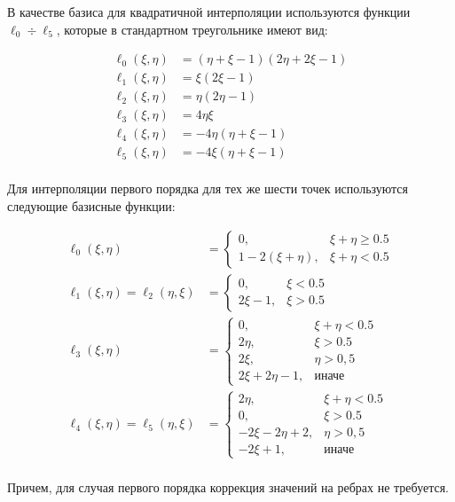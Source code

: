 В качестве базиса для квадратичной интерполяции используются функции $\ell_0 \div \ell_5$, которые в стандартном треугольнике  имеют вид:

\begin {equation}
\begin {aligned}
\ell_0 (\xi, \eta)&= (\eta + \xi -1)(2\eta + 2\xi - 1) \\
\ell_1 (\xi, \eta)&= \xi(2\xi - 1) \\
\ell_2 (\xi, \eta)&= \eta (2\eta - 1) \\
\ell_3 (\xi, \eta)&= 4\eta\xi \\
\ell_4 (\xi, \eta)&= -4\eta(\eta + \xi - 1) \\
\ell_5 (\xi, \eta)&= -4\xi(\eta + \xi - 1) \\
\end {aligned}
\end {equation}

Для интерполяции первого порядка для тех же шести точек используются следующие базисные функции:

\begin {equation}
\begin {aligned}
\ell_0 (\xi, \eta) &= 
\begin{cases}
0, & \xi + \eta \geqslant 0.5 \\
1-2(\xi + \eta), & \xi + \eta < 0.5
\end{cases}
 \\
\ell_1 (\xi, \eta) = \ell_2 (\eta, \xi) &= 
\begin{cases}
0, & \xi < 0.5 \\
2\xi - 1, & \xi > 0.5
\end{cases}
\\
\ell_3 (\xi, \eta) &=
\begin{cases}
0, & \xi + \eta < 0.5 \\
2\eta, & \xi > 0.5 \\
2\xi, &\eta > 0,5 \\
2\xi + 2\eta - 1, & \text{иначе}
\end{cases}
\\
\ell_4 (\xi, \eta) = \ell_5(\eta, \xi)&= 
\begin{cases}
2\eta, & \xi + \eta < 0.5 \\
0, & \xi > 0.5 \\
-2\xi -2\eta + 2, &\eta > 0,5 \\
-2\xi + 1, & \text{иначе}
\end{cases}
\\
\end {aligned}
\end {equation}

Причем, для случая первого порядка коррекция значений на ребрах не требуется.